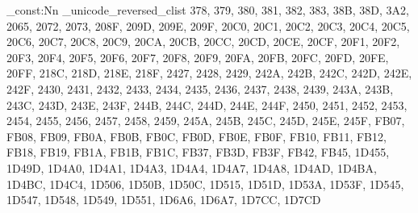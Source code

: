 \clist_const:Nn \fonttable_unicode_reversed_clist
  {
    378,
    379,
    380,
    381,
    382,
    383,
    38B,
    38D,
    3A2,
    2065,
    2072,
    2073,
    208F,
    209D,
    209E,
    209F,
    20C0,
    20C1,
    20C2,
    20C3,
    20C4,
    20C5,
    20C6,
    20C7,
    20C8,
    20C9,
    20CA,
    20CB,
    20CC,
    20CD,
    20CE,
    20CF,
    20F1,
    20F2,
    20F3,
    20F4,
    20F5,
    20F6,
    20F7,
    20F8,
    20F9,
    20FA,
    20FB,
    20FC,
    20FD,
    20FE,
    20FF,
    218C,
    218D,
    218E,
    218F,
    2427,
    2428,
    2429,
    242A,
    242B,
    242C,
    242D,
    242E,
    242F,
    2430,
    2431,
    2432,
    2433,
    2434,
    2435,
    2436,
    2437,
    2438,
    2439,
    243A,
    243B,
    243C,
    243D,
    243E,
    243F,
    244B,
    244C,
    244D,
    244E,
    244F,
    2450,
    2451,
    2452,
    2453,
    2454,
    2455,
    2456,
    2457,
    2458,
    2459,
    245A,
    245B,
    245C,
    245D,
    245E,
    245F,
    FB07,
    FB08,
    FB09,
    FB0A,
    FB0B,
    FB0C,
    FB0D,
    FB0E,
    FB0F,
    FB10,
    FB11,
    FB12,
    FB18,
    FB19,
    FB1A,
    FB1B,
    FB1C,
    FB37,
    FB3D,
    FB3F,
    FB42,
    FB45,
    1D455,
    1D49D,
    1D4A0,
    1D4A1,
    1D4A3,
    1D4A4,
    1D4A7,
    1D4A8,
    1D4AD,
    1D4BA,
    1D4BC,
    1D4C4,
    1D506,
    1D50B,
    1D50C,
    1D515,
    1D51D,
    1D53A,
    1D53F,
    1D545,
    1D547,
    1D548,
    1D549,
    1D551,
    1D6A6,
    1D6A7,
    1D7CC,
    1D7CD
  }
